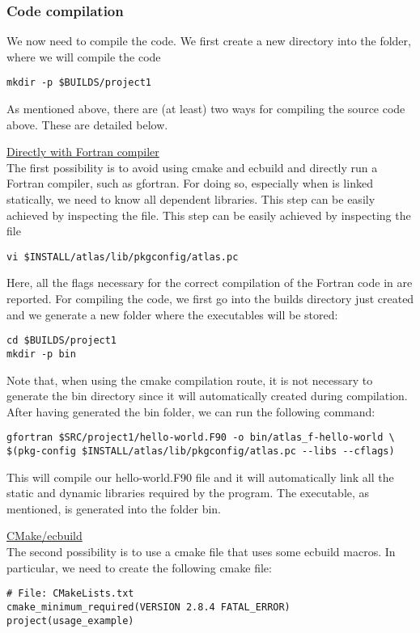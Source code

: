 \subsubsection*{Code compilation}
We now need to compile the code. We first create a new directory
into the  folder, where we will compile the code
%
\begin{lstlisting}[style=BashStyle]
mkdir -p $BUILDS/project1
\end{lstlisting}
%
As mentioned above, there are (at least) two ways for compiling 
the source code above. These are detailed below.
%
\begin{description}
%
\item \underline{Directly with Fortran compiler}\\[0.5em]
%
The first possibility is to avoid using cmake and ecbuild and 
directly run a Fortran compiler, such as gfortran.
For doing so, especially when \Atlas is linked statically,
we need to know all \Atlas dependent libraries. This step can be easily
achieved by inspecting the file. This step can be easily achieved by inspecting 
the file 
%
\begin{lstlisting}[style=BashStyle]
vi $INSTALL/atlas/lib/pkgconfig/atlas.pc
\end{lstlisting}
%
Here, all the flags necessary for the correct compilation 
of the Fortran code in  are reported. For 
compiling the code, we first go into the builds directory 
just created and we generate a new folder where the executables 
will be stored: 
%
\begin{lstlisting}[style=BashStyle]
cd $BUILDS/project1
mkdir -p bin
\end{lstlisting}
%
Note that, when using the cmake compilation route, it is not 
necessary to generate the bin directory since it will automatically 
created during compilation.
After having generated the bin folder, we can run the following 
command:
%
\begin{lstlisting}[style=BashStyle]
gfortran $SRC/project1/hello-world.F90 -o bin/atlas_f-hello-world \ 
$(pkg-config $INSTALL/atlas/lib/pkgconfig/atlas.pc --libs --cflags)
\end{lstlisting}
%
This will compile our hello-world.F90 file and it will automatically 
link all the static and dynamic libraries required by the program. 
The executable, as mentioned, is generated into the folder bin.
%
\item \underline{CMake/ecbuild}\\[0.5em]
%
The second possibility is to use a cmake file that uses some 
ecbuild macros. In particular, we need to create the following 
cmake file:
%
\begin{lstlisting}[style=CMakeStyle]
# File: CMakeLists.txt
cmake_minimum_required(VERSION 2.8.4 FATAL_ERROR)
project(usage_example)


\end{lstlisting}
\end{description}
